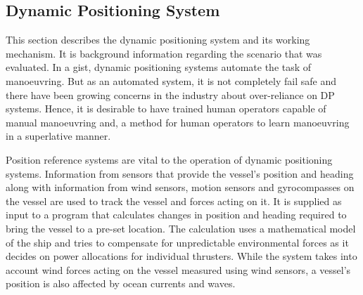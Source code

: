 \subsection{Dynamic Positioning System}
This section describes the dynamic positioning system and its working mechanism. It is background information regarding the scenario that was evaluated. In a gist, dynamic positioning systems automate the task of manoeuvring. But as an automated system, it is not completely fail safe and there have been growing concerns in the industry about over-reliance on DP systems. Hence, it is desirable to have trained human operators capable of manual manoeuvring and, a method for human operators to learn manoeuvring in a superlative manner.

%






Position reference systems are vital to the operation of dynamic positioning systems. Information from sensors that provide the vessel’s position and heading along with information from wind sensors, motion sensors and gyrocompasses on the vessel are used to track the vessel and forces acting on it. It is supplied as input to a program that calculates changes in position and heading required to bring the vessel to a pre-set location. The calculation uses a mathematical model of the ship and tries to compensate for unpredictable environmental forces as it decides on power allocations for individual thrusters. While the system takes into account wind forces acting on the vessel measured using wind sensors, a vessel's position is also affected by ocean currents and waves. 

